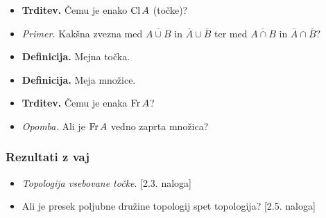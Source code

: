 \begin{enumerate}
\begin{itemize}
        \item \colorbox{blue!30}{\textbf{Trditev.}} Čemu je enako $\operatorname{Cl} A$ (točke)? 
        \item \colorbox{yellow!30}{\emph{Primer.}} Kakšna zvezna med $\overline{A \cup B}$ in $\overline{A} \cup \overline{B}$ ter med $\overline{A \cap B}$ in $\overline{A} \cap \overline{B}$?
        \item \colorbox{purple!30}{\textbf{Definicija.}} Mejna točka.
        \item \colorbox{purple!30}{\textbf{Definicija.}} Meja množice.
        \item \colorbox{blue!30}{\textbf{Trditev.}} Čemu je enaka $\operatorname{Fr} A$?
        \item \colorbox{yellow!30}{\emph{Opomba.}} Ali je $\operatorname{Fr} A$ vedno zaprta množica?
    \end{itemize}
\end{enumerate}

\subsubsection*{Rezultati z vaj}
\begin{itemize}
    \item \emph{Topologija vsebovane točke}. [2.3. naloga] 
    \item Ali je presek poljubne družine topologij spet topologija? [2.5. naloga]
\end{itemize}

